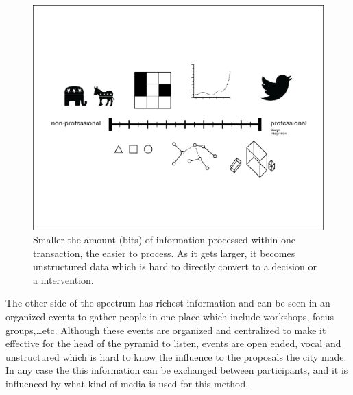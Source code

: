 \begin{figure}[!htb]
  \includegraphics[width=\textwidth]{chapters/2/fig/spectrum.png}               
  \caption[number of bits per transaction]{Smaller the amount (bits) of
    information processed within one transaction, the easier to process. As it
    gets larger, it becomes unstructured data which is hard to directly convert
  to a decision or a intervention.}
  \label{fig:spectrum}
\end{figure}

The other side of the spectrum has richest information and can be seen in
an organized events to gather people in one place which include workshops,
focus groups,\dots etc. 
Although these events are organized and centralized to make it effective
for the head of the pyramid to listen, events are open ended, vocal and
unstructured which is hard to know the influence to the proposals the city
made. In any case the this information can be exchanged between
participants, and it is influenced by what kind of media is used for this
method.

